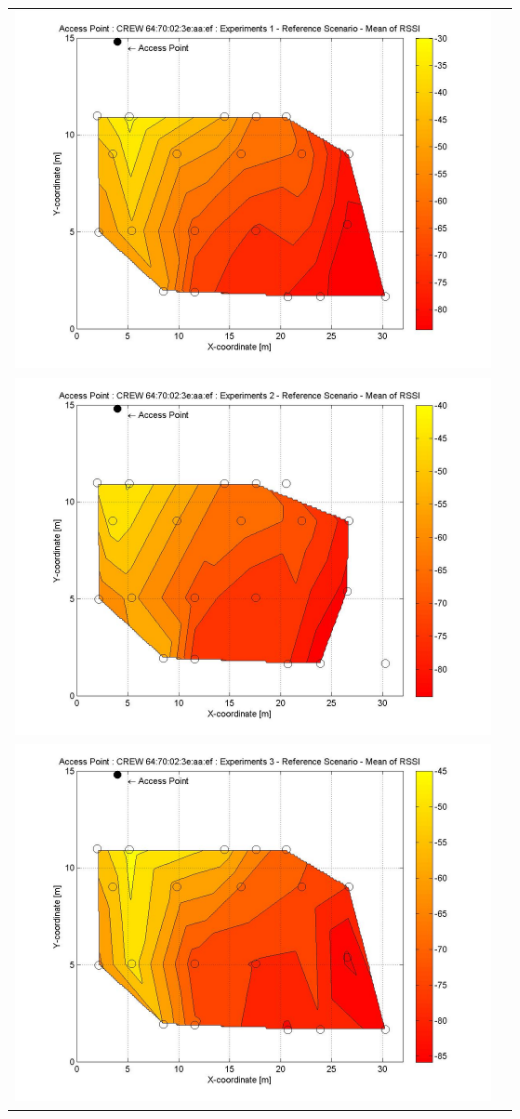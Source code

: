 \documentclass[11pt,a4paper,headinclude,footinclude,chapterprefix=on]{scrreprt}
\begin{document}
\begin{longtable}
	{lr} 
	\includegraphics[width=13cm]{../../Source/plot/CREW_ef/ef_Ref_Ex_1_Mean.jpg} \\
	\includegraphics[width=13cm]{../../Source/plot/CREW_ef/ef_Ref_Ex_2_Mean.jpg} \\
	\includegraphics[width=13cm]{../../Source/plot/CREW_ef/ef_Ref_Ex_3_Mean.jpg} \\

\end{longtable}
\end{document}
